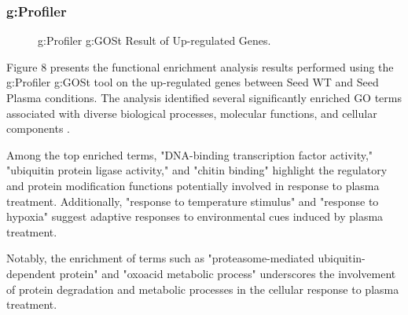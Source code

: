 \documentclass[12pt,letterpaper]{article}
\begin{document}
\subsubsection{g:Profiler}

\begin{figure}[H]
    \centering
    \caption{g:Profiler g:GOSt Result of Up-regulated Genes.}
    \label{fig:enter-label}
\end{figure}

Figure 8 presents the functional enrichment analysis results performed using the g:Profiler g:GOSt tool on the up-regulated genes between Seed WT and Seed Plasma conditions. The analysis identified several significantly enriched GO terms associated with diverse biological processes, molecular functions, and cellular components \parencite{reimand2007gProfiler}.

Among the top enriched terms, "DNA-binding transcription factor activity," "ubiquitin protein ligase activity," and "chitin binding" highlight the regulatory and protein modification functions potentially involved in response to plasma treatment. Additionally, "response to temperature stimulus" and "response to hypoxia" suggest adaptive responses to environmental cues induced by plasma treatment.

Notably, the enrichment of terms such as "proteasome-mediated ubiquitin-dependent protein" and "oxoacid metabolic process" underscores the involvement of protein degradation and metabolic processes in the cellular response to plasma treatment.
\end{document}
